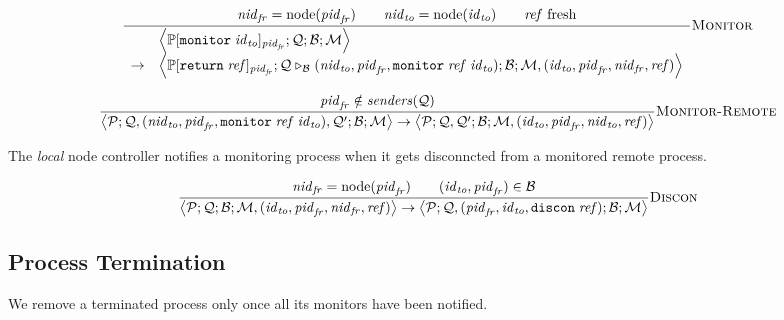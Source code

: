 \documentclass{article}
\newcommand{\sReturn}{\mathtt{return}}
\newcommand{\sMonitor}{\mathtt{monitor}}
\DeclareMathOperator{\sNodeOf}{node}
\newcommand{\sExtend}[1]{\mathrel{\triangleright_{#1}}}
\newcommand{\sNid}{\ensuremath{\mathit{nid}}}
\newcommand{\sPid}{\ensuremath{\mathit{pid}}}
\newcommand{\sId}{\ensuremath{\mathit{id}}}
\newcommand{\sRef}{\ensuremath{\mathit{ref}}}
\newcommand{\sSystem}[4]{\left\langle #1 ; #2 ; #3 ; #4 \right\rangle}
\newcommand{\sQueue}{\mathcal{Q}}
\newcommand{\sProcesses}{\mathcal{P}}
\newcommand{\sBlacklist}{\mathcal{B}}
\newcommand{\sMonitors}{\mathcal{M}}
\newcommand{\sCtxt}[1]{\mathbb{#1}}
\newcommand{\sSenders}{\mathit{senders}}
\begin{document}
\begin{equation*}
\frac{
  \sNid_\mathit{fr} = \sNodeOf(\sPid_\mathit{fr}) 
\qquad
  \sNid_\mathit{to} = \sNodeOf(\sId_\mathit{to})
\qquad
  \sRef \text{ fresh}
}{
\begin{array}{ll}
& \sSystem{\sCtxt{P}[ \sMonitor \; \sId_\mathit{to} ]_{\sPid_\mathit{fr}}}
          {\sQueue}
          {\sBlacklist}
          {\sMonitors}
\\         
\rightarrow &
  \sSystem{\sCtxt{P}[ \sReturn \; \sRef ]_{\sPid_\mathit{fr}}}
          {\sQueue \sExtend{\sBlacklist} (\sNid_\mathit{to}, \sPid_\mathit{fr}, \sMonitor \; \sRef \; \sId_\mathit{to})}
          {\sBlacklist}
          {\sMonitors, (\sId_\mathit{to}, \sPid_\mathit{fr}, \sNid_\mathit{fr}, \sRef)}
\end{array}
} \textsc{Monitor}
\end{equation*}

\begin{equation*}
\frac{
  \sPid_\mathit{fr} \notin \sSenders(\sQueue)
}{
  \sSystem{\sProcesses}
          {\sQueue, (\sNid_\mathit{to}, \sPid_\mathit{fr}, \sMonitor \; \sRef \; \sId_\mathit{to}), \sQueue'}
          {\sBlacklist}
          {\sMonitors}
\rightarrow          
  \sSystem{\sProcesses}
          {\sQueue, \sQueue'}
          {\sBlacklist}
          {\sMonitors, (\sId_\mathit{to}, \sPid_\mathit{fr}, \sNid_\mathit{to}, \sRef)}
} \textsc{Monitor-Remote}
\end{equation*}

The \emph{local} node controller notifies a monitoring process when it gets
disconncted from a monitored remote process.

\begin{equation*}
\frac{
  \sNid_\mathit{fr} = \sNodeOf(\sPid_\mathit{fr})
\qquad
  (\sId_\mathit{to}, \sPid_\mathit{fr}) \in \sBlacklist
}{
  \sSystem{\sProcesses}
          {\sQueue}
          {\sBlacklist}
          {\sMonitors, (\sId_\mathit{to}, \sPid_\mathit{fr}, \sNid_\mathit{fr}, \sRef)}
\rightarrow          
  \sSystem{\sProcesses}
          {\sQueue, (\sPid_\mathit{fr}, \sId_\mathit{to}, \mathtt{discon} \; \sRef)}
          {\sBlacklist}
          {\sMonitors}
} \textsc{Discon}
\end{equation*}

\subsection{Process Termination}

We remove a terminated process only once all its monitors have been notified.
\end{document}
